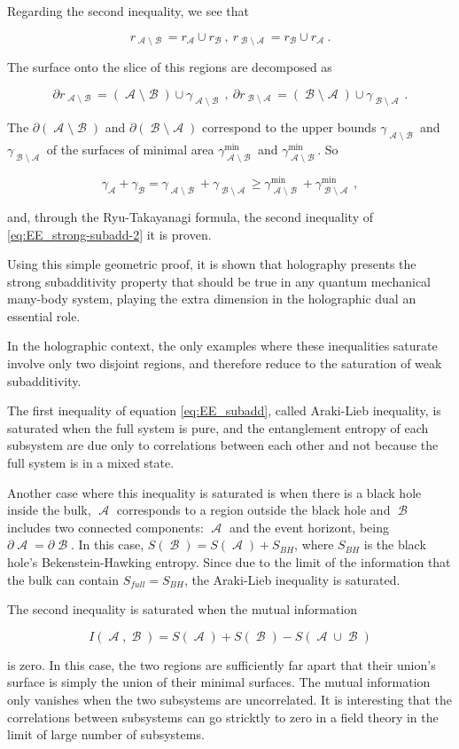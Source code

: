 \documentclass[lettersize,journal]{IEEEtran}
\providecommand{\eq}[2]{
    \begin{equation}
        #2
    \label{eq:#1}
    \end{equation}
}
\DeclareMathOperator{\calA}{\mathcal{A}}
\DeclareMathOperator{\calB}{\mathcal{B}}
\begin{document}
Regarding the second inequality, we see that
\eq{SS_r-2}{
    r_{\calA \setminus \calB} = r_{\calA} \cup r_{\calB} \ , \ r_{\calB \setminus \calA} = r_{\calB} \cup r_{\calA} \ .
}
The surface onto the slice of this regions are decomposed as
\eq{SS_dr-2}{
    \partial r_{\calA \setminus \calB} = (\calA \setminus \calB) \cup \gamma_{\calA \setminus \calB} \ , \ \partial r_{\calB \setminus \calA } = (\calB \setminus \calA) \cup \gamma_{\calB \setminus \calA} \ .
}
The $\partial (\calA \setminus \calB)$ and $\partial (\calB \setminus \calA)$ correspond to the upper bounds $\gamma_{\calA \setminus \calB}$ and $\gamma_{\calB \setminus \calA}$ of the surfaces of minimal area $\gamma^{\text{min}}_{\calA \setminus \calB}$ and $\gamma^{\text{min}}_{\calA \setminus \calB}$. So
\eq{SS_gamma-2}{
    \gamma_{\calA} + \gamma_{\calB} = \gamma_{\calA \setminus \calB} + \gamma_{\calB \setminus \calA} \ge \gamma^{\text{min}}_{\calA \setminus \calB} + \gamma^{\text{min}}_{\calB \setminus \calA} \ ,
}
and, through the Ryu-Takayanagi formula, the second inequality of \ref{eq:EE_strong-subadd-2} it is proven.

Using this simple geometric proof, it is shown that holography presents the strong subadditivity property that should be true in any quantum mechanical many-body system, playing the extra dimension in the holographic dual an essential role.

In the holographic context, the only examples where these inequalities saturate involve only two disjoint regions, and therefore reduce to the saturation of weak subadditivity.

The first inequality of equation \ref{eq:EE_subadd}, called Araki-Lieb inequality, is saturated when the full system is pure, and the entanglement entropy of each subsystem are due only to correlations between each other and not because the full system is in a mixed state.

Another case where this inequality is saturated is when there is a black hole inside the bulk, $\calA$ corresponds to a region outside the black hole and $\calB$ includes two connected components: $\calA$ and the event horizont, being $\partial \calA = \partial \calB$. In this case, $S(\calB) = S(\calA) + S_{BH}$, where $S_{BH}$ is the black hole's Bekenstein-Hawking entropy. Since due to the limit of the information that the bulk can contain $S_{full} = S_{BH}$, the Araki-Lieb inequality is saturated.

The second inequality is saturated when the mutual information
\eq{Mutual-Info}{
    I(\calA,\calB) = S(\calA) + S(\calB) - S(\calA \cup \calB)
}
is zero. In this case, the two regions are sufficiently far apart that their union's surface is simply the union of their minimal surfaces. The mutual information only vanishes when the two subsystems are uncorrelated. It is interesting that the correlations between subsystems can go stricktly to zero in a field theory in the limit of large number of subsystems.
\end{document}
